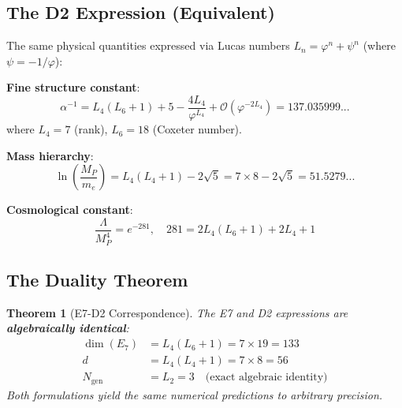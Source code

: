 \documentclass[11pt,a4paper]{article}
\newtheorem{theorem}{Theorem}
\begin{document}
\subsection{The D2 Expression (Equivalent)}

The same physical quantities expressed via Lucas numbers $L_n = \varphi^n + \psi^n$ (where $\psi = -1/\varphi$):

\textbf{Fine structure constant}:
\begin{equation}
\boxed{\alpha^{-1} = L_4(L_6+1) + 5 - \frac{4L_4}{\varphi^{L_4}} + \mathcal{O}(\varphi^{-2L_4}) = 137.035999...}
\end{equation}
where $L_4 = 7$ (rank), $L_6 = 18$ (Coxeter number).

\textbf{Mass hierarchy}:
\begin{equation}
\boxed{\ln\left(\frac{M_P}{m_e}\right) = L_4(L_4+1) - 2\sqrt{5} = 7 \times 8 - 2\sqrt{5} = 51.5279...}
\end{equation}

\textbf{Cosmological constant}:
\begin{equation}
\boxed{\frac{\Lambda}{M_P^4} = e^{-281}, \quad 281 = 2L_4(L_6+1) + 2L_4 + 1}
\end{equation}

\subsection{The Duality Theorem}

\begin{theorem}[E7-D2 Correspondence]
The E7 and D2 expressions are \textbf{algebraically identical}:
\begin{align}
\dim(E_7) &= L_4(L_6 + 1) = 7 \times 19 = 133 \\
d &= L_4(L_4 + 1) = 7 \times 8 = 56 \\
N_{\text{gen}} &= L_2 = 3 \quad \text{(exact algebraic identity)}
\end{align}
Both formulations yield the same numerical predictions to arbitrary precision.
\end{theorem}
\end{document}
